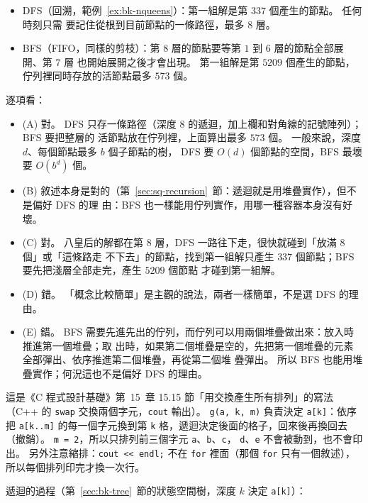 \begin{itemize}
\item DFS（回溯，範例~\ref{ex:bk-nqueens}）：第一組解是第 $337$ 個產生的節點。 任何時刻只需
要記住從根到目前節點的一條路徑，最多 $8$ 層。
\item BFS（FIFO，同樣的剪枝）：第 $8$ 層的節點要等第 $1$ 到 $6$ 層的節點全部展開、第 $7$ 層
也開始展開之後才會出現。 第一組解是第 $5209$ 個產生的節點，佇列裡同時存放的活節點最多
$573$ 個。
\end{itemize}

逐項看：
\begin{itemize}
\item (A) 對。 DFS 只存一條路徑（深度 $8$ 的遞迴，加上欄和對角線的記號陣列）；BFS 要把整層的
活節點放在佇列裡，上面算出最多 $573$ 個。 一般來說，深度 $d$、每個節點最多 $b$ 個子節點的樹，
DFS 要 $O(d)$ 個節點的空間，BFS 最壞要 $O(b^d)$ 個。
\item (B) 敘述本身是對的（第~\ref{sec:sq-recursion}~節：遞迴就是用堆疊實作），但不是偏好 DFS 的理
由：BFS 也一樣能用佇列實作，用哪一種容器本身沒有好壞。
\item (C) 對。 八皇后的解都在第 $8$ 層，DFS 一路往下走，很快就碰到「放滿 $8$ 個」或「這條路走
不下去」的節點，找到第一組解只產生 $337$ 個節點；BFS 要先把淺層全部走完，產生 $5209$ 個節點
才碰到第一組解。
\item (D) 錯。 「概念比較簡單」是主觀的說法，兩者一樣簡單，不是選 DFS 的理由。
\item (E) 錯。 BFS 需要先進先出的佇列，而佇列可以用兩個堆疊做出來：放入時推進第一個堆疊；取
出時，如果第二個堆疊是空的，先把第一個堆疊的元素全部彈出、依序推進第二個堆疊，再從第二個堆
疊彈出。 所以 BFS 也能用堆疊實作；何況這也不是偏好 DFS 的理由。
\end{itemize}

這是《C 程式設計基礎》第~15~章 15.15 節「用交換產生所有排列」的寫法（C++ 的 \texttt{swap}
交換兩個字元，\texttt{cout} 輸出）。 \texttt{g(a, k, m)} 負責決定 \texttt{a[k]}：依序把
\texttt{a[k..m]} 的每一個字元換到第 \texttt{k} 格，遞迴決定後面的格子，回來後再換回去
（撤銷）。 \texttt{m = 2}，所以只排列前三個字元 \texttt{a}、\texttt{b}、\texttt{c}，
\texttt{d}、\texttt{e} 不會被動到，也不會印出。 另外注意縮排：\texttt{cout << endl;} 不在
\texttt{for} 裡面（那個 \texttt{for} 只有一個敘述），所以每個排列印完才換一次行。

遞迴的過程（第~\ref{sec:bk-tree}~節的狀態空間樹，深度 $k$ 決定 \texttt{a[k]}）：

